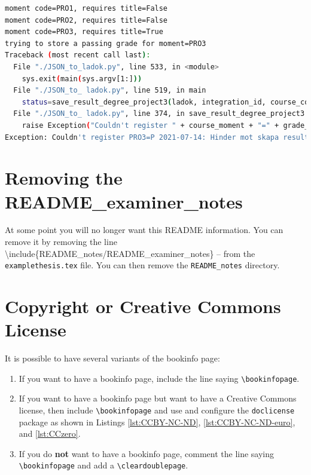 \begin{lstlisting}[language={bash}, caption={Using the extracted JSON to produce a LADOK entry}, label=lst:usingExtractedJSONtoProduceLADOKentry]
moment code=PRO1, requires title=False
moment code=PRO2, requires title=False
moment code=PRO3, requires title=True
trying to store a passing grade for moment=PRO3
Traceback (most recent call last):
  File "./JSON_to_ladok.py", line 533, in <module>
    sys.exit(main(sys.argv[1:]))
  File "./JSON_to_ ladok.py", line 519, in main
    status=save_result_degree_project3(ladok, integration_id, course_code, mom['Utbildningskod'], '2021-07-14', 'P', "PF", main_title, alternative_main_title)
  File "./JSON_to_ ladok.py", line 374, in save_result_degree_project3
    raise Exception("Couldn't register " + course_moment + "=" + grade_raw + " " + result_date_raw + ": " + r.json()["Meddelande"])
Exception: Couldn't register PRO3=P 2021-07-14: Hinder mot skapa resultat påträffat: Rapporteringsrättighet saknas
\end{lstlisting}


\section{Removing the README\_examiner\_notes}
At some point you will no longer want this README information. You can remove it by removing the line
\textbackslash include\{README\_notes/README\_examiner\_notes\} -- from the \texttt{examplethesis.tex} file. You can then remove the \texttt{README\_notes} directory.

\section[Copyright or Creative Commons License]{Copyright or Creative Commons\\ License}
\label{sec:copyrightOrCClicenseExaminer}
It is possible to have several variants of the bookinfo page:
\begin{enumerate}[labelwidth =\widthof{\textbf{Creative Commons (CC)}}, leftmargin = !]
    \item[copyright] If you want to have a bookinfo page, include the line saying \texttt{\textbackslash bookinfopage}.
    \item[Creative Commons (CC)] If you want to have a bookinfo page but want to have a Creative Commons license, then include \texttt{\textbackslash bookinfopage} and use and configure the \texttt{doclicense} package as shown in Listings \ref{lst:CCBY-NC-ND}, \ref{lst:CCBY-NC-ND-euro}, and \ref{lst:CCzero}.
    \item[none] If you do \textbf{not} want to have a bookinfo page, comment the line saying \texttt{\textbackslash bookinfopage} and add a \texttt{\textbackslash cleardoublepage}.
\end{enumerate}

